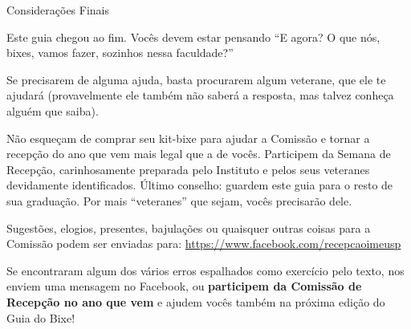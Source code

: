 \begin{secao}{Considerações Finais}

Este guia chegou ao fim. Vocês devem estar pensando ``E agora? O que nós, bixes,
vamos fazer, sozinhos nessa faculdade?''

Se precisarem de alguma ajuda, basta procurarem algum veterane, que ele te
ajudará (provavelmente ele também não saberá a resposta, mas talvez conheça
alguém que saiba).

Não esqueçam de comprar seu kit-bixe para ajudar a Comissão e tornar a recepção
do ano que vem mais legal que a de vocês. Participem da Semana de Recepção,
carinhosamente preparada pelo Instituto e pelos seus veteranes devidamente
identificados. Último conselho: guardem este guia para o resto de sua graduação.
Por mais ``veteranes'' que sejam, vocês precisarão dele.

Sugestões, elogios, presentes, bajulações ou quaisquer outras coisas para a
Comissão podem ser enviadas para: \url{https://www.facebook.com/recepcaoimeusp}

Se encontraram algum dos vários erros espalhados como exercício pelo texto,
nos enviem uma mensagem no Facebook, ou \textbf{participem da Comissão de Recepção 
no ano que vem} e ajudem vocês também na próxima edição do Guia do Bixe!

\end{secao}

